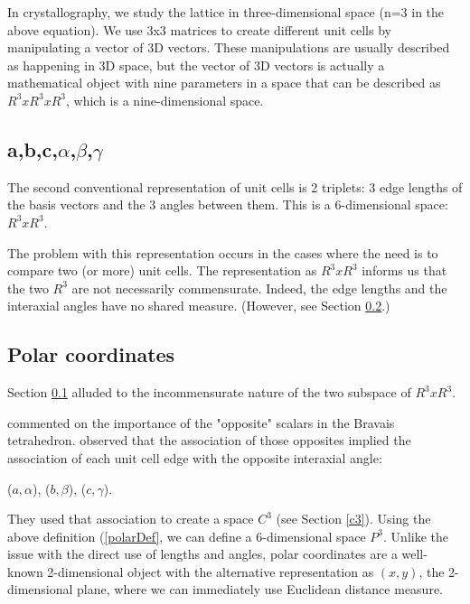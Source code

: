 \documentclass[preprint]{iucr}              %
\numberwithin{equation}{section}
\begin{document}
In crystallography, we study the lattice in three-dimensional space (n=3 in the above equation). We use 3x3 matrices to create different unit cells by manipulating a vector of 3D vectors. These manipulations are usually described as happening in 3D space, but the vector of 3D vectors is actually a mathematical object with nine parameters in a space that can be described as $R^3xR^3xR^3$, which is a nine-dimensional space.

\subsection{a,b,c,$\alpha$,$\beta$,$\gamma$}
\label{length/angles}

The second conventional representation of unit cells is
2 triplets: 3 edge lengths of the basis vectors and
the 3 angles between them. This is a 6-dimensional 
space: $R^3xR^3$.

The problem with this representation occurs in the cases
where the need is to compare two (or more) unit cells. 
The representation as  $R^3xR^3$ informs us that the
two  $R^3$ are not necessarily commensurate. Indeed,
the edge lengths and the interaxial angles have no
shared measure. (However, see Section \ref{polar}.)

\subsection{Polar coordinates}
\label{polar}

Section \ref{length/angles} alluded to the incommensurate
nature of the two subspace of $R^3xR^3$. 

 commented on the importance of the "opposite"
scalars in the Bravais tetrahedron.  observed
that the association of those opposites implied the association of
each unit cell edge with the opposite interaxial angle:

\begin{center}
	\label{polarDef}
	($a,\alpha$), ($b,\beta$), ($c, \gamma$).
\end{center}
\noindent
They used that association to create a space $C^3$ (see Section \ref{c3}).
Using the above definition (\ref{polarDef}, we can define a 6-dimensional
space $P^3$. Unlike the issue with the direct use of lengths and angles,
polar coordinates are a well-known 2-dimensional object with the alternative
representation as $(x,y)$, the 2-dimensional plane, where we
can immediately use Euclidean distance measure.
\end{document}
